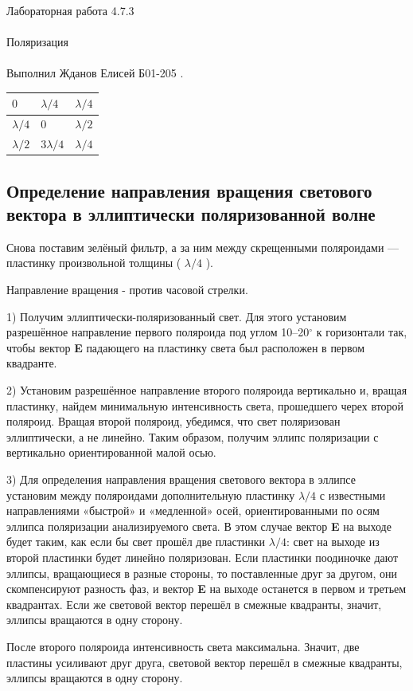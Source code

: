 \documentclass{astroedu-lab}
\begin{document}
\begin{problem}{\huge Лабораторная работа 4.7.3\\\\Поляризация\\\\Выполнил Жданов Елисей Б01-205}
.

    \begin{table}[h]
    \centering
    \vspace{0.1cm}
    \label{tab:my_label}
    \begin{tabular}{ |p{2.5cm}|p{2.5cm}|p{2.5cm}|}
 \hline
 $0$ & $\lambda/4$ & $\lambda/4$\\
\hline
 $\lambda/4$ & 0 & $\lambda/2$ \\
\hline
 $\lambda/2$ & $3\lambda/4$ & $\lambda/4$ \\
\hline
 
\end{tabular}
\end{table}

\subsection{Определение направления вращения светового вектора в эллиптически поляризованной волне}

 Снова поставим зелёный фильтр,
а за ним между скрещенными поляроидами
— пластинку произвольной толщины (
$\lambda/4$ ).

Направление вращения - против часовой стрелки.

1) Получим эллиптически-поляризованный свет. Для этого установим разрешённое направление первого поляроида под углом 10–20$^\circ$ к горизонтали так, чтобы вектор \textbf{E} падающего на пластинку света был расположен в первом квадранте.

2) Установим разрешённое направление второго поляроида вертикально и, вращая пластинку, найдем минимальную интенсивность света, прошедшего черех второй поляроид. Вращая второй поляроид, убедимся, что свет поляризован эллиптически, а не линейно. Таким образом, получим эллипс поляризации с вертикально ориентированной малой осью.

3)  Для определения направления вращения светового вектора в эллипсе
установим между поляроидами дополнительную пластинку $\lambda/4$ с известными направлениями «быстрой» и «медленной» осей, ориентированными по осям эллипса поляризации анализируемого света.
В этом случае вектор \textbf{E} на выходе будет таким, как если бы свет прошёл две
пластинки $\lambda/4$: свет на выходе из второй пластинки будет линейно поляризован. Если пластинки поодиночке дают эллипсы, вращающиеся в разные стороны, то поставленные друг за другом, они скомпенсируют
разность фаз, и вектор \textbf{E} на выходе останется в первом
и третьем квадрантах. Если
же световой вектор перешёл в смежные квадранты, значит, эллипсы вращаются в одну сторону. 
\par После второго поляроида интенсивность света максимальна. Значит, две пластины усиливают друг друга, световой вектор перешёл в смежные квадранты, эллипсы вращаются в одну сторону.







\end{problem}
\end{document}
